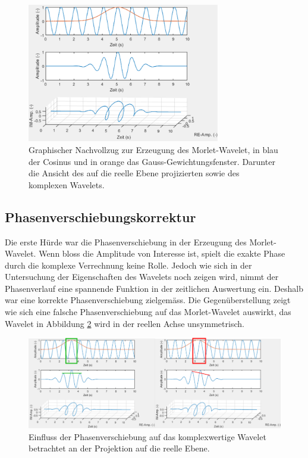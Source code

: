 \begin{figure}
	\centering
	\includegraphics[width=0.75\textwidth]{papers/wavelets/images/7_MorletWavelet.png}
	\caption{Graphischer Nachvollzug zur Erzeugung des
	Morlet-Wavelet, in blau der Cosinus und in orange das
	Gauss-Gewichtungsfenster.
	Darunter die Ansicht des auf die reelle Ebene projizierten
	sowie des komplexen Wavelets.}
	\label{wavelet:fig:MorletWavelet}
\end{figure}

\subsection{Phasenverschiebungskorrektur
	\label{wavelets:subsection:Phasenverschiebung}}
Die erste Hürde war die Phasenverschiebung in der Erzeugung des
Morlet-Wavelet.
Wenn bloss die Amplitude von Interesse ist, spielt die exakte Phase
durch die komplexe Verrechnung keine Rolle.
Jedoch wie sich in der Untersuchung der Eigenschaften des Wavelets
noch zeigen wird, nimmt der Phasenverlauf eine spannende Funktion
in der zeitlichen Auswertung ein.
Deshalb war eine korrekte Phasenverschiebung zielgemäss.
Die Gegenüberstellung zeigt wie sich eine falsche Phasenverschiebung
auf das Morlet-Wavelet auswirkt, das Wavelet in Abbildung
\ref{wavelet:fig:PhaseShiftFailVsCor} wird in der reellen Achse
unsymmetrisch.

\begin{figure}
	\centering
	\includegraphics[width=\textwidth]{papers/wavelets/images/9_PhaseShiftFailVsCor.png}
	\caption{Einfluss der Phasenverschiebung auf das komplexwertige
	Wavelet betrachtet an der Projektion auf die reelle Ebene.}
	\label{wavelet:fig:PhaseShiftFailVsCor}
\end{figure}

